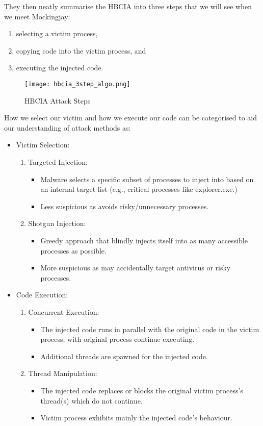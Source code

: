 They then neatly summarise the HBCIA into three steps that we will see when we meet Mockingjay:

\begin{enumerate}
\item selecting a victim process,
\item copying code into the victim process, and
\item executing the injected code.
\end{enumerate}

\begin{figure}[ht]
\texttt{[image: hbcia\_3step\_algo.png]}
\caption{HBCIA Attack Steps \autocite{Barabosch:2014}}
\end{figure}


How we select our victim and how we execute our code can be categorised to aid our understanding of attack methods as:

\begin{itemize}
\item Victim Selection:
  \begin{enumerate}
  \item Targeted Injection:
    \begin{itemize}
    \item Malware selects a specific subset of processes to inject into based on an internal target list (e.g., critical
        processes like explorer.exe.)
    \item Less suspicious as avoids risky/unnecessary processes.
    \end{itemize}
  \item Shotgun Injection:
    \begin{itemize}
    \item Greedy approach that blindly injects itself into as many accessible processes as possible.
    \item More suspicious as may accidentally target antivirus or risky processes.
    \end{itemize}
  \end{enumerate}
\item Code Execution:
  \begin{enumerate}
  \item Concurrent Execution:
    \begin{itemize}
    \item The injected code runs in parallel with the original code in the victim process, with original process continue executing.
    \item Additional threads are spawned for the injected code.
    \end{itemize}
  \item Thread Manipulation:
    \begin{itemize}
    \item The injected code replaces or blocks the original victim process's thread(s) which do not continue.
    \item Victim process exhibits mainly the injected code's behaviour.
    \end{itemize}
  \end{enumerate}
\end{itemize}

